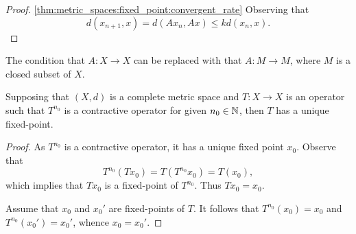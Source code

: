 \begin{proof}
\ref{thm:metric_spaces:fixed_point:convergent_rate}
Observing that 
\begin{equation*}
    d(x_{n+1}, x) = d(Ax_n, Ax) \le k d(x_n, x). 
\end{equation*}
\end{proof}

\begin{rmk}
The condition that $A: X \to X$ can be replaced with that $A: M \to M$, 
where $M$ is a closed subset of $X$. 
\end{rmk}

\begin{cor}
Supposing that $(X, d)$ is a complete metric space and $T: X \to X$ is an 
operator such that $T^{n_0}$ is a contractive operator for given $n_0 \in 
\mathbb{N}$, then $T$ has a unique fixed-point. 
\end{cor}
\begin{proof}
As $T^{n_0}$ is a contractive operator, it has a unique fixed point $x_0$. 
Observe that 
\begin{equation*}
    T^{n_0}(Tx_0) = T(T^{n_0}x_0) = T(x_0), 
\end{equation*}
which implies that $Tx_0$ is a fixed-point of $T^{n_0}$. 
Thus $Tx_0 = x_0$. 

Assume that $x_0$ and $x_0'$ are fixed-points of $T$. 
It follows that $T^{n_0}(x_0) = x_0$ and $T^{n_0}(x_0') = x_0'$, 
whence $x_0 = x_0'$. 
\end{proof}

